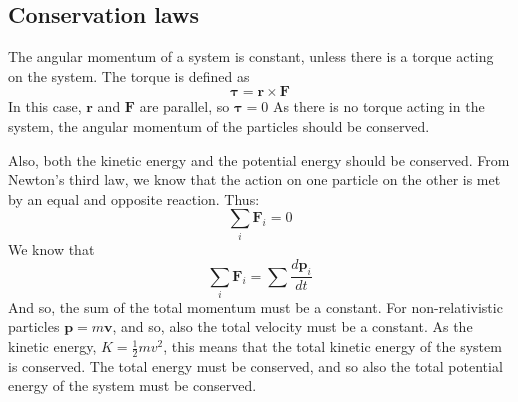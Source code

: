 \subsection{Conservation laws}\label{sec:cons}

The angular momentum of a system is constant, unless there is a torque acting on the system. The torque is defined as 
\begin{equation}
\mathbf{\tau} = \mathbf{r}  \times \mathbf{F}
\end{equation}
In this case, $\mathbf{r}$ and $\mathbf{F}$ are parallel, so $\mathbf{\tau} = 0$
As there is no torque acting in the system, the angular momentum of the particles should be conserved. 

Also, both the kinetic energy and the potential energy should be conserved. 
From Newton's third law, we know that the action on one particle on the other is met by an equal and opposite reaction. Thus:
\begin{equation}
\sum_i \mathbf{F}_i  = 0
\end{equation}
We know that 
\begin{equation}
\sum_i \mathbf{F}_i = \sum\frac{d\mathbf{p}_i}{dt}
\end{equation}
And so, the sum of the total momentum must be a constant. For non-relativistic particles $\mathbf{p}= m\mathbf{v}$, and so, also the total velocity must be a constant. As the kinetic energy, $K = \frac{1}{2}mv^2$, this means that the total kinetic energy of the system is conserved. The total energy must be conserved, and so also the total potential energy of the system must be conserved. 

